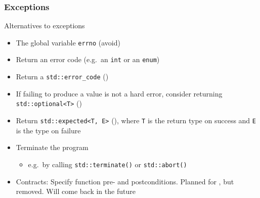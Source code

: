 \begin{advanced}
\begin{frame}[fragile]
  \frametitle{Exceptions}
  \begin{block}{Alternatives to exceptions}
    \begin{itemize}
      \item The global variable \texttt{errno} (avoid)
      \item Return an error code (e.g.\ an \texttt{int} or an \texttt{enum})
      \item Return a \texttt{std::error_code} ()
      \item If failing to produce a value is not a hard error, consider returning \texttt{std::optional<T>} ()
      \item Return \texttt{std::expected<T, E>} (), where \texttt{T} is the return type on success and \texttt{E} is the type on failure
      \item Terminate the program
        \begin{itemize}
        \item e.g.\ by calling \texttt{std::terminate()} or \texttt{std::abort()}
        \end{itemize}
      \item Contracts: Specify function pre- and postconditions. Planned for , but removed. Will come back in the future
    \end{itemize}
  \end{block}
\end{frame}


\end{advanced}
